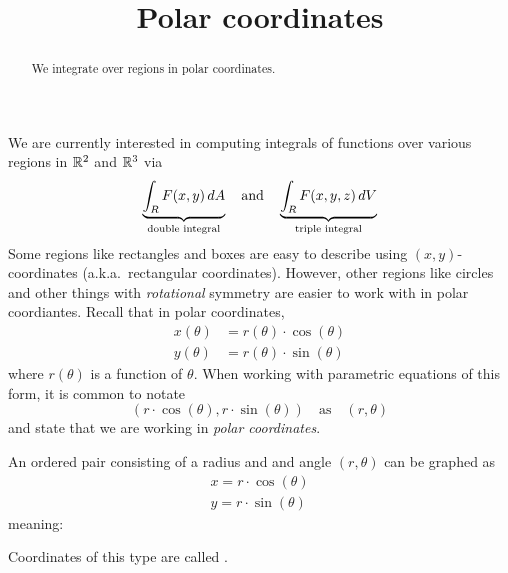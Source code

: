 \documentclass{ximera}
\title[Dig-In:]{Polar coordinates}
\begin{document}
\begin{abstract}
  We integrate over regions in polar coordinates.
\end{abstract}
\maketitle

We are currently interested in computing integrals of functions over
various regions in $\mathbb R^2$ and $\mathbb R^3$ via
\[
\underbrace{\int_R F(x,y) \mathop{}\!d A}_{\text{double integral}} \quad\text{and}\quad \underbrace{\int_R F(x,y,z) \mathop{}\!d V}_{\text{triple integral}}
\]
Some regions like rectangles and boxes are easy to describe using
$(x,y)$-coordinates (a.k.a.\ rectangular coordinates). However, other
regions like circles and other things with \textit{rotational}
symmetry are easier to work with in polar coordiantes. Recall that in
polar coordinates,
\begin{align*} 
  x(\theta) &= r(\theta) \cdot \cos(\theta)\\
  y(\theta) &= r(\theta) \cdot \sin(\theta)
\end{align*}
where $r(\theta)$ is a function of $\theta$.  When working with
parametric equations of this form, it is common to notate
\[
(r \cdot \cos(\theta), r\cdot \sin(\theta)) \quad\text{as}\quad (r,\theta)
\]
and state that we are working in \textit{polar coordinates}.

\begin{definition}
  An ordered pair consisting of a radius and and angle $(r,\theta)$
  can be graphed as
  \begin{align*}
    x = r\cdot \cos(\theta)\\
    y = r\cdot \sin(\theta)
  \end{align*}
  meaning:
  \begin{image}[2in]
  \end{image}
  Coordinates of this type are called .
\end{definition}
\end{document}
